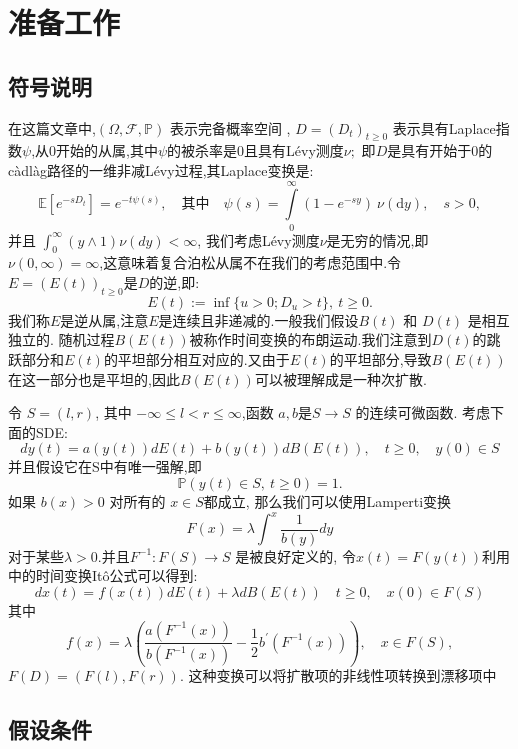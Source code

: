 

\chapter{准备工作}\label{chap:LaTeXEnv}

\section{符号说明}
在这篇文章中,$(\Omega,\mathcal{F},\mathbb{P})$ 表示完备概率空间 , $D=(D_t)_{t\geq0}$ 表示具有Laplace指数$\psi$,从0开始的从属,其中$\psi$的被杀率是0且具有Lévy测度$\nu;$ 即$D$是具有开始于0的càdlàg路径的一维非减Lévy过程,其Laplace变换是:
$$\mathbb{E}[e^{-sD_t}]=e^{-t\psi(s)},\quad\text{其中}\quad\psi(s)=\int\limits_0^\infty(1-e^{-sy})\:\nu(\text{d}y),\quad s>0,$$
并且 $\int_0^\infty(y\wedge1)\nu(dy) < \infty$,
我们考虑Lévy测度$\nu$是无穷的情况,即$\nu ( 0, \infty ) = \infty$,这意味着复合泊松从属不在我们的考虑范围中.令 $E=(E(t))_{t\geq0}$是$D$的逆,即:
$$E(t):=\inf\{u>0;D_u>t\},\:t\geq0.$$
我们称$E$是逆从属,注意$E$是连续且非递减的.一般我们假设$B(t)$ 和 $D(t)$ 是相互独立的. 随机过程$B(E(t))$被称作时间变换的布朗运动.我们注意到$D(t)$的跳跃部分和$E(t)$的平坦部分相互对应的.又由于$E(t)$的平坦部分,导致$B(E(t))$在这一部分也是平坦的,因此$B(E(t))$可以被理解成是一种次扩散.

令 $S=(l,r)$, 其中 $-\infty\leq l<r\leq\infty$,函数 $a,b$是$S\to S$ 的连续可微函数. 考虑下面的SDE:
$$dy(t)=a(y(t))dE(t)+b(y(t))dB(E(t)),\quad t\geq0,\quad y(0)\in S$$
并且假设它在S中有唯一强解,即
$$\mathbb{P}(y(t)\in S,\:t\geq0)=1.$$
如果 $b(x)>0$ 对所有的 $x\in S$都成立, 那么我们可以使用Lamperti变换
\begin{equation}\label{Lamperti}
	F(x)=\lambda\int^x\frac1{b(y)}dy
\end{equation}
对于某些$\lambda>0.$并且$F^{-1}:F(S)\to S$ 是被良好定义的, 令$x(t)=F(y(t))$利用\cite{umarov2018beyond}中的时间变换It\^{o}公式可以得到:
$$dx(t)=f(x(t))dE(t) + \lambda dB(E(t)) \quad t\geq0,\quad x(0)\in F(S)$$
其中
$$f(x)=\lambda\left(\frac{a(F^{-1}(x))}{b(F^{-1}(x))}-\frac12b^{\prime}(F^{-1}(x))\right),\quad x\in F(S),$$
$F(D)=(F(l),F(r)).$ 这种变换可以将扩散项的非线性项转换到漂移项中

\section{假设条件}

